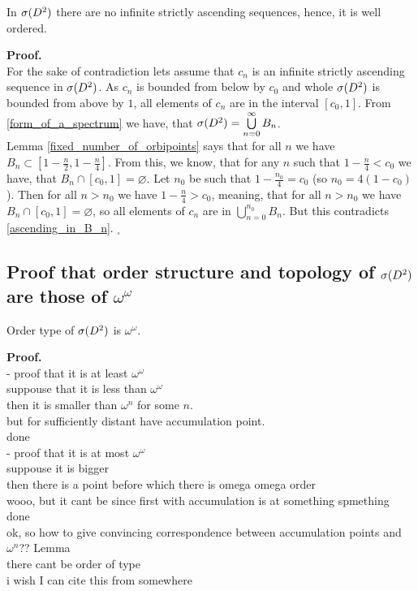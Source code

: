 \begin{theorem}\label{well_order}
In ${{\sigma}(D^2)}$ there are no infinite strictly ascending sequences, hence, it is well ordered.
\end{theorem}
\noindent\textbf{Proof.} \\
For the sake of contradiction lets assume that $c_n$ is an infinite strictly ascending sequence in 
${{\sigma}(D^2)}$. As $c_n$ is bounded from below by $c_0$ and whole ${{\sigma}(D^2)}$ is bounded from above 
by $1$, all elements of $c_n$ are in the interval $[c_0, 1]$. 
From \ref{form_of_a_spectrum} we have, that ${{\sigma}(D^2)} = \bigcup\limits^\infty_{n=0}B_n$. \\
Lemma 
\ref{fixed_number_of_orbipoints} says that for all $n$ we
have $B_n \subset [1-\frac{n}{2}, 1 - \frac{n}{4}]$. From this, we know, that for any 
$n$ such that $1 - \frac{n}{4} < c_0$ 
we have, that $B_n \cap [c_0,1] = \varnothing $. Let $n_0$ be such that 
$1 - \frac{n_0}{4} = c_0$ (so $n_0 = 4(1-c_0)$). 
Then for all $n > n_0$ we have $1 - \frac{n}{4} > c_0$, meaning, that 
for all $n > n_0$ we have
$B_n \cap [c_0,1] = \varnothing $, so all elements of $c_n$ are in 
$\bigcup\limits_{n=0}^{n_0} B_n$.
But this contradicts \ref{ascending_in_B_n}.  $_\square$









\subsection{Proof that order structure and topology of ${{\sigma}(D^2)}$ are those of $\omega^\omega$}
\begin{theorem}\label{speD_order_type}
Order type of ${{\sigma}(D^2)}$ is $\omega^\omega$. 
\end{theorem}
\textbf{Proof.} \\
- proof that it is at least $\omega^\omega$ \\
suppouse that it is less than $\omega^\omega$\\
then it is smaller than $\omega^n$ for some $n$. \\
but for sufficiently distant have accumulation point. \\
done \\
- proof that it is at most $\omega^\omega$\\
suppouse it is bigger \\
then there is a point before which there is omega omega order \\
wooo, but it cant be since first with accumulation is at something spmething \\
done \\
ok, so how to give convincing correspondence between accumulation points and $\omega^n$??
Lemma \\
there cant be order of type \\
i wish I can cite this from somewhere \\ 
%
%

